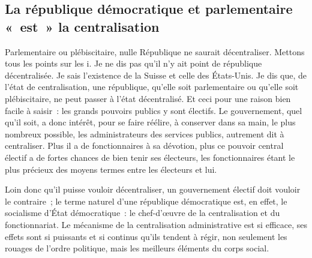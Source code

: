 \documentclass[french,twoside]{book} %
\newcommand{\astermono}{\medskip\centerline{\color{rubric}\large\selectfont{\syms ✻}}\medskip\par}%
\begin{document}
\astermono

\subsection[La république démocratique et parlementaire « est » la centralisation]{La république démocratique et parlementaire « est » la centralisation}
\noindent Parlementaire ou plébiscitaire, nulle République ne saurait décentraliser. Mettons tous les points sur les i. Je ne dis pas qu’il n’y ait point de république décentralisée. Je sais l’existence de la Suisse et celle des États-Unis. Je dis que, de l’état de centralisation, une république, qu’elle soit parlementaire ou qu’elle soit plébiscitaire, ne peut passer à l’état décentralisé. Et ceci pour une raison bien facile à saisir : les grands pouvoirs publics y sont électifs. Le gouvernement, quel qu’il soit, a donc intérêt, pour se faire réélire, à conserver dans sa main, le plus nombreux possible, les administrateurs des services publics, autrement dit à centraliser. Plus il a de fonctionnaires à sa dévotion, plus ce pouvoir central électif a de fortes chances de bien tenir ses électeurs, les fonctionnaires étant le plus précieux des moyens termes entre les électeurs et lui.\par
Loin donc qu’il puisse vouloir décentraliser, un gouvernement électif doit vouloir le contraire ; le terme naturel d’une république démocratique est, en effet, le socialisme d’État démocratique : le chef-d’œuvre de la centralisation et du fonctionnariat. Le mécanisme de la centralisation administrative est si efficace, ses effets sont si puissants et si continus qu’ils tendent à régir, non seulement les rouages de l’ordre politique, mais les meilleurs éléments du corps social.\par

\astermono
\end{document}
